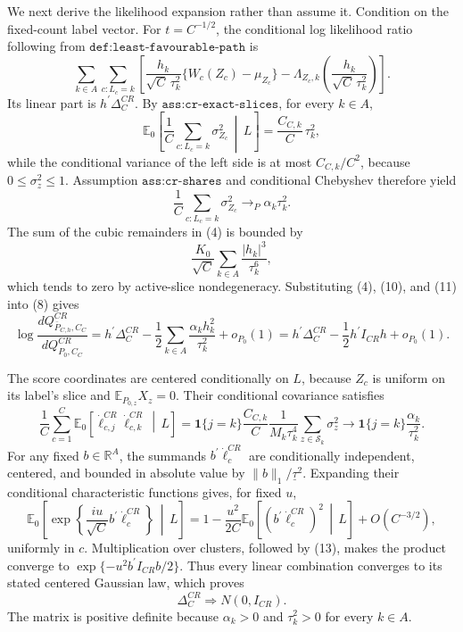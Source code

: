 We next derive the likelihood expansion rather than assume it.  Condition on the fixed-count label vector.  For \(t=C^{-1/2}\), the conditional log likelihood ratio following from \(\texttt{def:least-favourable-path}\) is
\[
\sum_{k\in A}\sum_{c:L_c=k}
\left[
\frac{h_k}{\sqrt C\,\tau_k^2}\{W_c(Z_c)-\mu_{Z_c}\}
-\Lambda_{Z_c,k}\!\left(\frac{h_k}{\sqrt C\,\tau_k^2}\right)
\right].
\tag{8}
\]
Its linear part is \(h^{\prime}\Delta_C^{CR}\).  By \(\texttt{ass:cr-exact-slices}\), for every \(k\in A\),
\[
\mathbb E_0\!\left[
\frac1C\sum_{c:L_c=k}\sigma_{Z_c}^2\,\middle|\,L
\right]
=\frac{C_{C,k}}C\,\tau_k^2,
\tag{9}
\]
while the conditional variance of the left side is at most \(C_{C,k}/C^2\), because \(0\leq\sigma_z^2\leq1\).  Assumption \(\texttt{ass:cr-shares}\) and conditional Chebyshev therefore yield
\[
\frac1C\sum_{c:L_c=k}\sigma_{Z_c}^2
\longrightarrow_P\alpha_k\tau_k^2.
\tag{10}
\]
The sum of the cubic remainders in (4) is bounded by
\[
\frac{K_0}{\sqrt C}\sum_{k\in A}\frac{|h_k|^3}{\tau_k^6},
\tag{11}
\]
which tends to zero by active-slice nondegeneracy.  Substituting (4), (10), and (11) into (8) gives
\[
\log\frac{dQ^{CR}_{\bar P_{C,h},C_C}}{dQ^{CR}_{P_0,C_C}}
=h^{\prime}\Delta_C^{CR}
-\frac12\sum_{k\in A}\frac{\alpha_kh_k^2}{\tau_k^2}+o_{P_0}(1)
=h^{\prime}\Delta_C^{CR}-\frac12h^{\prime}I_{CR}h+o_{P_0}(1).
\tag{12}
\]

The score coordinates are centered conditionally on \(L\), because \(Z_c\) is uniform on its label's slice and \(\mathbb E_{P_{0,z}}X_z=0\).  Their conditional covariance satisfies
\[
\frac1C\sum_{c=1}^C
\mathbb E_0\!\left[
\dot\ell_{c,j}^{CR}\dot\ell_{c,k}^{CR}\,\middle|\,L
\right]
=\mathbf1\{j=k\}\frac{C_{C,k}}C
\frac1{M_k\tau_k^4}\sum_{z\in\mathcal S_k}\sigma_z^2
\longrightarrow
\mathbf1\{j=k\}\frac{\alpha_k}{\tau_k^2}.
\tag{13}
\]
For any fixed \(b\in\mathbb R^A\), the summands \(b^{\prime}\dot\ell_c^{CR}\) are conditionally independent, centered, and bounded in absolute value by \(\lVert b\rVert_1/\underline\tau^2\).  Expanding their conditional characteristic functions gives, for fixed \(u\),
\[
\mathbb E_0\!\left[
\exp\!\left\{\frac{iu}{\sqrt C}b^{\prime}\dot\ell_c^{CR}\right\}
\,\middle|\,L\right]
=1-\frac{u^2}{2C}\mathbb E_0\!\left[
(b^{\prime}\dot\ell_c^{CR})^2\,\middle|\,L\right]+O(C^{-3/2}),
\tag{14}
\]
uniformly in \(c\).  Multiplication over clusters, followed by (13), makes the product converge to \(\exp\{-u^2b^{\prime}I_{CR}b/2\}\).  Thus every linear combination converges to its stated centered Gaussian law, which proves
\[
\Delta_C^{CR}\Rightarrow N(0,I_{CR}).
\tag{15}
\]
The matrix is positive definite because \(\alpha_k>0\) and \(\tau_k^2>0\) for every \(k\in A\).

